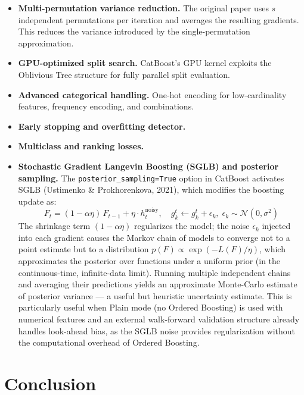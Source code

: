 \documentclass[11pt, a4paper]{article}
\begin{document}
\begin{itemize}
  \item \textbf{Multi-permutation variance reduction.} The original paper
    uses $s$ independent permutations per iteration and averages the
    resulting gradients. This reduces the variance introduced by the
    single-permutation approximation.
  \item \textbf{GPU-optimized split search.} CatBoost's GPU kernel
    exploits the Oblivious Tree structure for fully parallel split evaluation.
  \item \textbf{Advanced categorical handling.} One-hot encoding for
    low-cardinality features, frequency encoding, and combinations.
  \item \textbf{Early stopping and overfitting detector.}
  \item \textbf{Multiclass and ranking losses.}
  \item \textbf{Stochastic Gradient Langevin Boosting (SGLB) and posterior sampling.}
    The \texttt{posterior\_sampling=True} option in CatBoost activates SGLB
    (Ustimenko \& Prokhorenkova, 2021), which modifies the boosting update as:
    \[
      F_t = (1 - \alpha\eta)\,F_{t-1} + \eta\cdot h_t^{\text{noisy}},
      \quad g_k^t \leftarrow g_k^t + \epsilon_k,\;\epsilon_k \sim \mathcal{N}(0,\sigma^2)
    \]
    The shrinkage term $(1-\alpha\eta)$ regularizes the model; the noise
    $\epsilon_k$ injected into each gradient causes the Markov chain of
    models to converge not to a point estimate but to a distribution
    $p(F) \propto \exp(-L(F)/\eta)$, which approximates the posterior over functions
    under a uniform prior (in the continuous-time, infinite-data limit). Running multiple independent chains and averaging
    their predictions yields an approximate Monte-Carlo estimate of posterior variance
    --- a useful but heuristic uncertainty estimate. This is particularly useful when
    Plain mode (no Ordered Boosting) is used with numerical features and
    an external walk-forward validation structure already handles look-ahead
    bias, as the SGLB noise provides regularization without the computational
    overhead of Ordered Boosting.
\end{itemize}

\section{Conclusion}
\end{document}

